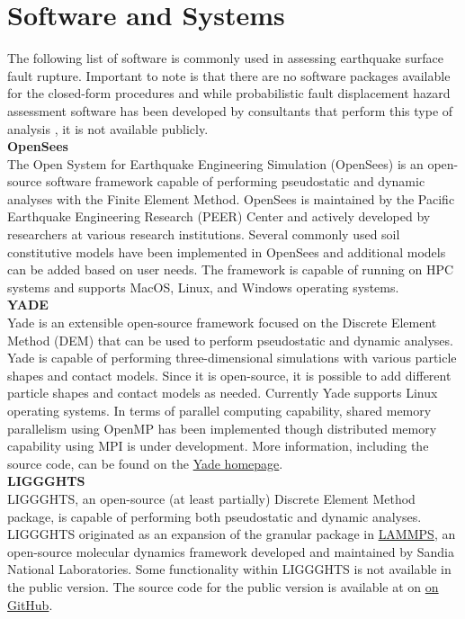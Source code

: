 \section{Software and Systems}
\label{sec:eq_surface_rup_tools}

The following list of software is commonly used in assessing earthquake surface fault rupture. Important to note is that there are no software packages available for the closed-form procedures and while probabilistic fault displacement hazard assessment software has been developed by consultants that perform this type of analysis \citep{wells2014probabilistic}, it is not available publicly.\\

\noindent\textbf{OpenSees}\\
The Open System for Earthquake Engineering Simulation (OpenSees) is an open-source software framework capable of performing pseudostatic and dynamic analyses with the Finite Element Method. OpenSees is maintained by the Pacific Earthquake Engineering Research (PEER) Center and actively developed by researchers at various research institutions. Several commonly used soil constitutive models have been implemented in OpenSees and additional models can be added based on user needs. The framework is capable of running on HPC systems and supports MacOS, Linux, and Windows operating systems.\\

\noindent \textbf{YADE} \\
Yade is an extensible open-source framework focused on the Discrete Element Method (DEM) \citep{yade2005doc} that can be used to perform pseudostatic and dynamic analyses. Yade is capable of performing three-dimensional simulations with various particle shapes and contact models. Since it is open-source, it is possible to add different particle shapes and contact models as needed. Currently Yade supports Linux operating systems. In terms of parallel computing capability, shared memory parallelism using OpenMP has been implemented though distributed memory capability using MPI is under development. More information, including the source code, can be found on the \href{https://yade-dem.org/doc/}{Yade homepage}.\\

\noindent\textbf{LIGGGHTS}\\
LIGGGHTS, an open-source (at least partially) Discrete Element Method package, is capable of performing both pseudostatic and dynamic analyses. LIGGGHTS originated as an expansion of the granular package in \href{https://lammps.sandia.gov/}{LAMMPS}, an open-source molecular dynamics framework developed and maintained by Sandia National Laboratories. Some functionality within LIGGGHTS is not available in the public version. The source code for the public version is available at on \href{https://github.com/CFDEMproject/LIGGGHTS-PUBLIC}{on GitHub}.\\


